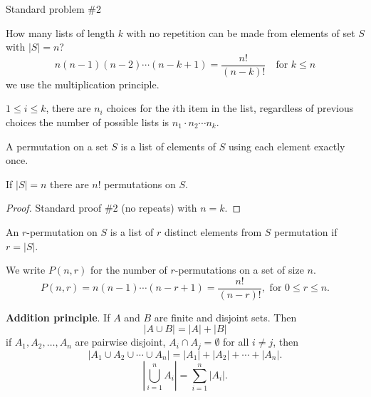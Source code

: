 \documentclass[10pt, a4paper]{article}
\begin{document}
Standard problem \#2

How many lists of length $k$ with no repetition can be made from elements of set $S$ with $|S| = n$?
\[
n(n - 1)(n - 2) \dotsi (n - k + 1) = \frac{n!}{(n - k)!}\quad\text{for } k \leq n
\]
we use the multiplication principle.

$1 \leq i \leq k$, there are $n_i$ choices for the $i$th item in the list, regardless of previous choices the number of possible lists is $n_1  \cdot n_2 \dotsi n_k$.

\begin{definition}
    A permutation on a set $S$ is a list of elements of $S$ using each element exactly once.
\end{definition}

\begin{proposition}
    If $|S| = n$ there are $n!$ permutations on $S$.

    \begin{proof}
        Standard proof \#2 (no repeats) with $n = k$.
    \end{proof}
\end{proposition}

An $r$-permutation on $S$ is a list of $r$ distinct elements from $S$ permutation if $r = |S|$.

We write $P(n, r)$ for the number of $r$-permutations on a set of size $n$.
\[
P(n, r) = n(n - 1) \dotsi (n - r + 1) = \frac{n!}{(n - r)!},\text{ for } 0 \leq r \leq n.
\]

\textbf{Addition principle}. If $A$ and $B$ are finite and disjoint sets. Then
\[
|A \cup B| = |A| + |B|
\]
if $A_1, A_2, \dotsc, A_n$ are pairwise disjoint, $A_i \cap A_j = \emptyset$ for all $i \neq j$, then
\[
|A_1 \cup A_2 \cup \dotsi \cup A_n| = |A_1| + |A_2| + \dotsi + |A_n|.
\]
\[
\left|\bigcup_{i = 1}^{n}A_i\right| = \sum_{i = 1}^{n}|A_i|.
\]
\end{document}
